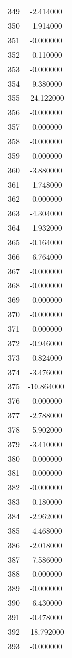 \documentclass[12pt]{article}
\begin{document}
\begin{longtable}{@{}cc@{}}
349 & -2.414000 \\
350 & -1.914000 \\
351 & -0.000000 \\
352 & -0.110000 \\
353 & -0.000000 \\
354 & -9.380000 \\
355 & -24.122000 \\
356 & -0.000000 \\
357 & -0.000000 \\
358 & -0.000000 \\
359 & -0.000000 \\
360 & -3.880000 \\
361 & -1.748000 \\
362 & -0.000000 \\
363 & -4.304000 \\
364 & -1.932000 \\
365 & -0.164000 \\
366 & -6.764000 \\
367 & -0.000000 \\
368 & -0.000000 \\
369 & -0.000000 \\
370 & -0.000000 \\
371 & -0.000000 \\
372 & -0.946000 \\
373 & -0.824000 \\
374 & -3.476000 \\
375 & -10.864000 \\
376 & -0.000000 \\
377 & -2.788000 \\
378 & -5.902000 \\
379 & -3.410000 \\
380 & -0.000000 \\
381 & -0.000000 \\
382 & -0.000000 \\
383 & -0.180000 \\
384 & -2.962000 \\
385 & -4.468000 \\
386 & -2.018000 \\
387 & -7.586000 \\
388 & -0.000000 \\
389 & -0.000000 \\
390 & -6.430000 \\
391 & -0.478000 \\
392 & -18.792000 \\
393 & -0.000000 \\

\end{longtable}
\end{document}
